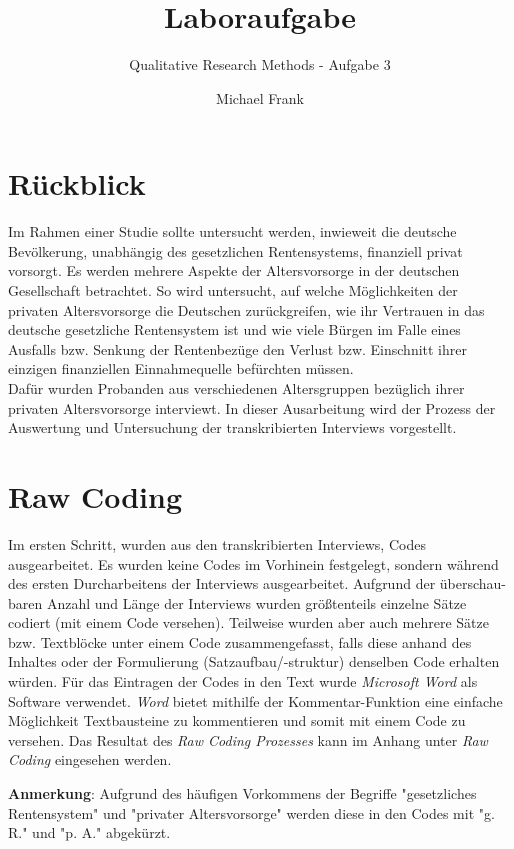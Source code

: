 \documentclass{hsflensburg}
\title{Laboraufgabe}
\subtitle{Qualitative Research Methods - Aufgabe 3}
\author{
	Michael Frank
}
\begin{document}
	\maketitle
 	 \tableofcontents

  \pagebreak
	
	\section{Rückblick}
	Im Rahmen einer Studie sollte untersucht werden, inwieweit die deutsche Bevölkerung,
	unabhängig des gesetzlichen Rentensystems, finanziell privat vorsorgt. Es werden mehrere Aspekte
	der Altersvorsorge in der deutschen Gesellschaft betrachtet. So wird untersucht, auf welche Möglichkeiten
	der privaten Altersvorsorge die Deutschen zurückgreifen, wie ihr Vertrauen in das deutsche gesetzliche
	Rentensystem ist und wie viele Bürgen im Falle eines Ausfalls bzw. Senkung der Rentenbezüge den Verlust
	bzw. Einschnitt ihrer einzigen finanziellen Einnahmequelle befürchten müssen. \\

	Dafür wurden Probanden aus verschiedenen Altersgruppen bezüglich ihrer privaten Altersvorsorge interviewt. In 
	dieser Ausarbeitung wird der Prozess der Auswertung und Untersuchung der transkribierten Interviews vorgestellt.
 

	\section{Raw Coding}
	Im ersten Schritt, wurden aus den transkribierten Interviews, Codes ausgearbeitet. Es wurden keine Codes 
	im Vorhinein festgelegt, sondern während des ersten Durcharbeitens der Interviews ausgearbeitet. 
	Aufgrund der überschau- baren Anzahl und Länge der Interviews wurden größtenteils einzelne Sätze codiert (mit einem
	Code versehen). Teilweise wurden aber auch mehrere Sätze bzw. Textblöcke unter einem Code zusammengefasst, falls 
	diese anhand des Inhaltes oder der Formulierung (Satzaufbau/-struktur) denselben Code erhalten würden. Für das Eintragen
	der Codes in den Text wurde \textit{Microsoft Word} als Software verwendet. \textit{Word} bietet mithilfe der Kommentar-Funktion 
	eine einfache Möglichkeit Textbausteine zu kommentieren und somit mit einem Code zu versehen. Das Resultat des 
	\textit{Raw Coding Prozesses} kann im Anhang unter \textit{Raw Coding} eingesehen werden. 

	\textbf{Anmerkung}: Aufgrund des häufigen Vorkommens der Begriffe "gesetzliches Rentensystem" und "privater 
	Altersvorsorge" werden diese in den Codes mit "g. R." und "p. A." abgekürzt.
\end{document}
